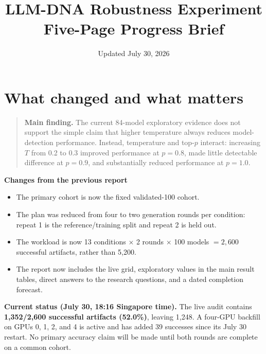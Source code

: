 \documentclass[10pt,a4paper]{article}
\title{\vspace{-1.4cm}LLM-DNA Robustness Experiment\\
\large Five-Page Progress Brief}
\author{}
\date{Updated July 30, 2026}
\begin{document}
\maketitle
\vspace{-0.8cm}

\section{What changed and what matters}

\begin{quote}
\textbf{Main finding.} The current 84-model exploratory evidence does not
support the simple claim that higher temperature always reduces model-detection
performance. Instead, temperature and top-$p$ interact: increasing $T$ from
0.2 to 0.3 improved performance at $p=0.8$, made little detectable difference
at $p=0.9$, and substantially reduced performance at $p=1.0$.
\end{quote}

\textbf{Changes from the previous report}

\begin{itemize}
  \item The primary cohort is now the fixed validated-100 cohort.
  \item The plan was reduced from four to two generation rounds per condition:
        repeat 1 is the reference/training split and repeat 2 is held out.
  \item The workload is now 13 conditions $\times$ 2 rounds $\times$ 100
        models $=2{,}600$ successful artifacts, rather than 5,200.
  \item The report now includes the live grid, exploratory values in the main
        result tables, direct answers to the research questions, and a dated
        completion forecast.
\end{itemize}

\textbf{Current status (July 30, 18:16 Singapore time).}
The live audit contains \textbf{1,352/2,600 successful artifacts (52.0\%)},
leaving 1,248. A four-GPU backfill on GPUs 0, 1, 2, and 4 is active and has
added 39 successes since its July 30 restart. No primary accuracy claim will
be made until both rounds are complete on a common cohort.
\end{document}
